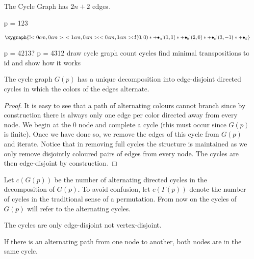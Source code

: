 \begin{remark}
The Cycle Graph has $2n+2$ edges.
\end{remark}

\begin{example}
p = 123

\begin{align*}
\xygraph{
!{<0cm,0cm>;<1cm,0cm>:<0cm,1cm>::}
!{(0,0) }*+{\bullet_{a}}
!{(1,1) }*+{\bullet_{b}}
!{(2,0) }*+{\bullet_{c}}
!{(3,-1)}*+{\bullet_{d}}
}
\end{align*}



p = 4213?
p = 4312
draw cycle graph
count cycles
find minimal transpositions to id and show how it works
\end{example}

\begin{lemma}
The cycle graph $G(p)$ has a unique decomposition into edge-disjoint directed cycles in which the colors of the edges alternate.
\end{lemma}

\begin{proof}
It is easy to see that a path of alternating colours cannot branch since by construction there is always only one edge per color directed away from every node. We begin at the $0$ node and complete a cycle (this must occur since $G(p)$ is finite). Once we have done so, we remove the edges of this cycle from $G(p)$ and iterate. Notice that in removing full cycles the structure is maintained as we only remove disjointly coloured pairs of edges from every node. The cycles are then edge-disjoint by construction.
\end{proof}

\begin{definition}
Let $c(G(p))$ be the number of alternating directed cycles in the decomposition of $G(p)$. To avoid confusion, let $c(\Gamma (p))$ denote the number of cycles in the traditional sense of a permutation. From now on the cycles of $G(p)$ will refer to the alternating cycles.
\end{definition}

\begin{remark}
The cycles are only edge-disjoint not vertex-disjoint.
\end{remark}

\begin{remark}
If there is an alternating path from one node to another, both nodes are in the same cycle.
\end{remark}




